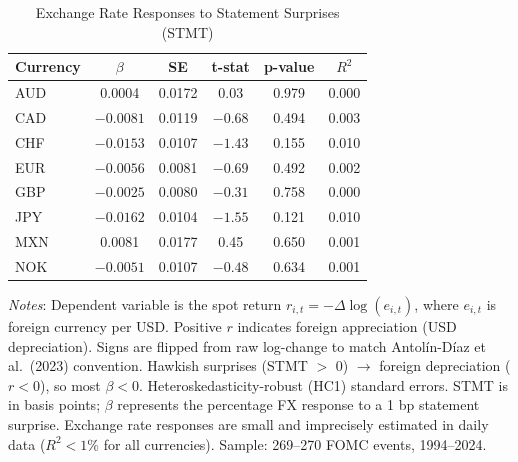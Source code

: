 \begin{table}[htbp]
\centering
\caption{Exchange Rate Responses to Statement Surprises (STMT)}
\label{tab:fx_response}
\begin{tabular}{lccccc}
\toprule
Currency & $\beta$ & SE & t-stat & p-value & $R^2$ \\
\midrule
AUD & 0.0004 & 0.0172 & 0.03 & 0.979 & 0.000 \\
CAD & $-0.0081$ & 0.0119 & $-0.68$ & 0.494 & 0.003 \\
CHF & $-0.0153$ & 0.0107 & $-1.43$ & 0.155 & 0.010 \\
EUR & $-0.0056$ & 0.0081 & $-0.69$ & 0.492 & 0.002 \\
GBP & $-0.0025$ & 0.0080 & $-0.31$ & 0.758 & 0.000 \\
JPY & $-0.0162$ & 0.0104 & $-1.55$ & 0.121 & 0.010 \\
MXN & 0.0081 & 0.0177 & 0.45 & 0.650 & 0.001 \\
NOK & $-0.0051$ & 0.0107 & $-0.48$ & 0.634 & 0.001 \\
\bottomrule
\end{tabular}
\begin{flushleft}
\footnotesize \textit{Notes}: Dependent variable is the spot return
$r_{i,t} = -\Delta\log(e_{i,t})$, where $e_{i,t}$ is foreign currency per USD.
Positive $r$ indicates foreign appreciation (USD depreciation).
Signs are flipped from raw log-change to match Antol\'{i}n-D\'{i}az et al.\ (2023) convention.
Hawkish surprises (STMT $>$ 0) $\rightarrow$ foreign depreciation ($r < 0$), so most $\beta < 0$.
Heteroskedasticity-robust (HC1) standard errors. STMT is in basis points;
$\beta$ represents the percentage FX response to a 1 bp statement surprise.
Exchange rate responses are small and imprecisely estimated in daily data
($R^2 < 1\%$ for all currencies). Sample: 269--270 FOMC events, 1994--2024.
\end{flushleft}
\end{table}

